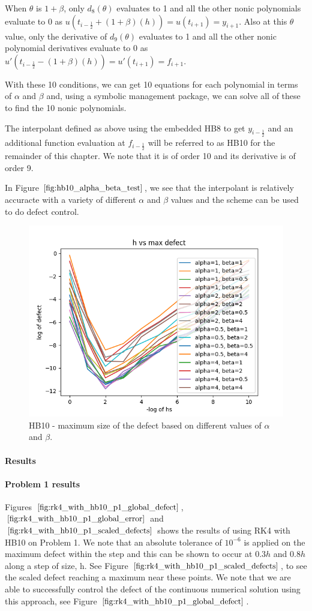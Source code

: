 When $\theta$ is $1 + \beta$, only $d_8(\theta)$ evaluates to 1 and all the other nonic polynomials evaluate to 0 as $u(t_{i-\frac{1}{2}} + (1 + \beta)(h)) = u(t_{i+1}) = y_{i+1}$. Also at this $\theta$ value, only the derivative of $d_9(\theta)$ evaluates to 1 and all the other nonic polynomial derivatives evaluate to 0 as $u'(t_{i-\frac{1}{2}} - (1 + \beta)(h)) = u'(t_{i+1}) = f_{i+1}$. 

With these 10 conditions, we can get 10 equations for each polynomial in terms of $\alpha$ and $\beta$ and, using a symbolic management package, we can solve all of these to find the 10 nonic polynomials.

The interpolant defined as above using the embedded HB8 to get $y_{i-\frac{1}{2}}$ and an additional function evaluation at $f_{i-\frac{1}{2}}$ will be referred to as HB10 for the remainder of this chapter. We note that it is of order 10 and its derivative is of order 9.

In Figure $\ref{fig:hb10_alpha_beta_test}$, we see that the interpolant is relatively accuracte with a variety of different $\alpha$ and $\beta$ values and the scheme can be used to do defect control.

\begin{figure}[H]
\centering
\includegraphics[width=0.7\linewidth]{./figures/hb10_alpha_beta_test}
\caption{HB10 - maximum size of the defect based on different values of $\alpha$ and $\beta$.}
\label{fig:hb10_alpha_beta_test}
\end{figure}


\paragraph{Results}
\paragraph{Problem 1 results}
Figures $\ref{fig:rk4_with_hb10_p1_global_defect}$, $\ref{fig:rk4_with_hb10_p1_global_error}$ and $\ref{fig:rk4_with_hb10_p1_scaled_defects}$ shows the results of using RK4 with HB10 on Problem 1. We note that an absolute tolerance of $10^{-6}$ is applied on the maximum defect within the step and this can be shown to occur at $0.3h$ and $0.8h$ along a step of size, h. See Figure $\ref{fig:rk4_with_hb10_p1_scaled_defects}$, to see the scaled defect reaching a maximum near these points. We note that we are able to successfully control the defect of the continuous numerical solution using this approach, see Figure $\ref{fig:rk4_with_hb10_p1_global_defect}$. 

